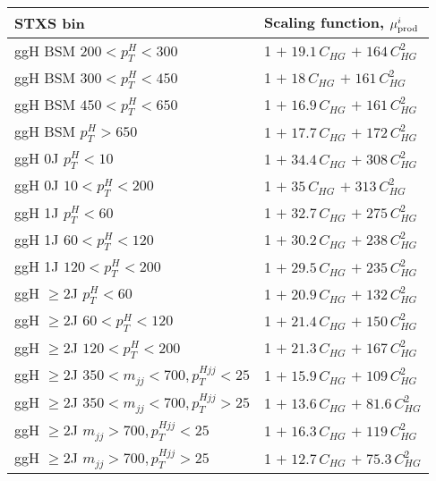 \begin{tabular}{l|p{}}
    \hline
    STXS bin & Scaling function, $\mu^i_{\rm{prod}}$ \\ \hline
    ggH BSM $200< p_{T}^{H} < 300$ & 1 $+\;19.1\,C_{HG}$ $+\;164\,C_{HG}^{2}$ \\
    ggH BSM $300< p_{T}^{H} < 450$ & 1 $+\;18\,C_{HG}$ $+\;161\,C_{HG}^{2}$ \\
    ggH BSM $450 < p_{T}^{H} < 650$ & 1 $+\;16.9\,C_{HG}$ $+\;161\,C_{HG}^{2}$ \\
    ggH BSM $p_{T}^{H} > 650$ & 1 $+\;17.7\,C_{HG}$ $+\;172\,C_{HG}^{2}$ \\
    ggH 0J $p_{T}^{H} < 10$ & 1 $+\;34.4\,C_{HG}$ $+\;308\,C_{HG}^{2}$ \\
    ggH 0J $10 < p_{T}^{H} < 200$ & 1 $+\;35\,C_{HG}$ $+\;313\,C_{HG}^{2}$ \\
    ggH 1J $p_{T}^{H} < 60$ & 1 $+\;32.7\,C_{HG}$ $+\;275\,C_{HG}^{2}$ \\
    ggH 1J $60 < p_{T}^{H} < 120$ & 1 $+\;30.2\,C_{HG}$ $+\;238\,C_{HG}^{2}$ \\
    ggH 1J $120 < p_{T}^{H} < 200$ & 1 $+\;29.5\,C_{HG}$ $+\;235\,C_{HG}^{2}$ \\
    ggH $\geq$2J $p_{T}^{H} < 60$ & 1 $+\;20.9\,C_{HG}$ $+\;132\,C_{HG}^{2}$ \\
    ggH $\geq$2J $60 < p_{T}^{H} < 120$ & 1 $+\;21.4\,C_{HG}$ $+\;150\,C_{HG}^{2}$ \\
    ggH $\geq$2J $120 < p_{T}^{H} < 200$ & 1 $+\;21.3\,C_{HG}$ $+\;167\,C_{HG}^{2}$ \\
    ggH $\geq$2J $350 < m_{jj} < 700, p_{T}^{Hjj} < 25$ & 1 $+\;15.9\,C_{HG}$ $+\;109\,C_{HG}^{2}$ \\
    ggH $\geq$2J $350 < m_{jj} < 700, p_{T}^{Hjj} > 25$ & 1 $+\;13.6\,C_{HG}$ $+\;81.6\,C_{HG}^{2}$ \\
    ggH $\geq$2J $m_{jj} > 700, p_{T}^{Hjj} < 25$ & 1 $+\;16.3\,C_{HG}$ $+\;119\,C_{HG}^{2}$ \\
    ggH $\geq$2J $m_{jj} > 700, p_{T}^{Hjj} > 25$ & 1 $+\;12.7\,C_{HG}$ $+\;75.3\,C_{HG}^{2}$ \\
    \hline
\end{tabular}